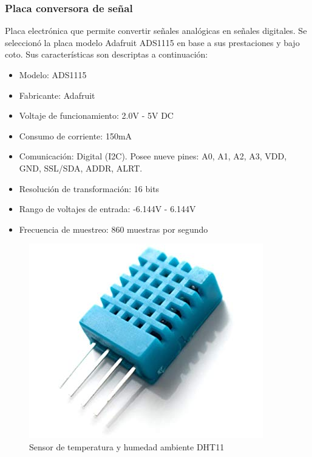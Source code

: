         \subsubsection{Placa conversora de señal}
        
        \par Placa electrónica que permite convertir señales analógicas en señales digitales. Se seleccionó la placa modelo Adafruit ADS1115 en base a sus prestaciones y bajo coto.
        Sus características son descriptas a continuación:
        \begin{itemize}
                    \item Modelo: ADS1115
                    \item Fabricante: Adafruit
                    \item Voltaje de funcionamiento: 2.0V - 5V DC
                    \item Consumo de corriente: 150mA
                    \item Comunicación: Digital (I2C). Posee nueve pines: A0, A1, A2, A3, VDD, GND, SSL/SDA, ADDR, ALRT.
                    \item Resolución de transformación: 16 bits
                    \item Rango de voltajes de entrada: -6.144V - 6.144V
                    \item Frecuencia de muestreo: 860 muestras por segundo 
        \end{itemize}
        
        \begin{figure} [h]
            \centering
            \includegraphics[scale=0.35]{hardware/dht11_.jpg}
            \caption{Sensor de temperatura y humedad ambiente DHT11}
            \label{SensorDHT11}
        \end{figure}
        
